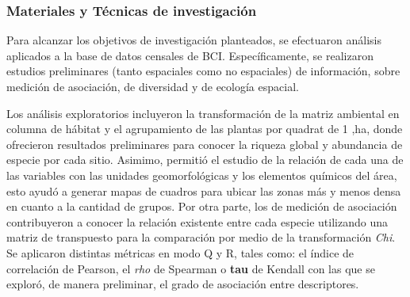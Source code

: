 \documentclass[11pt,]{article}
\begin{document}
\subsubsection{Materiales y Técnicas de
investigación}\label{materiales-y-tuxe9cnicas-de-investigaciuxf3n}

Para alcanzar los objetivos de investigación planteados, se efectuaron
análisis aplicados a la base de datos censales de BCI. Específicamente,
se realizaron estudios preliminares (tanto espaciales como no
espaciales) de información, sobre medición de asociación, de diversidad
y de ecología espacial.

Los análisis exploratorios incluyeron la transformación de la matriz
ambiental en columna de hábitat y el agrupamiento de las plantas por
quadrat de 1 ,ha, donde ofrecieron resultados preliminares para conocer
la riqueza global y abundancia de especie por cada sitio. Asimimo,
permitió el estudio de la relación de cada una de las variables con las
unidades geomorfológicas y los elementos químicos del área, esto ayudó a
generar mapas de cuadros para ubicar las zonas más y menos densa en
cuanto a la cantidad de grupos. Por otra parte, los de medición de
asociación contribuyeron a conocer la relación existente entre cada
especie utilizando una matriz de transpuesto para la comparación por
medio de la transformación \emph{Chi}. Se aplicaron distintas métricas
en modo Q y R, tales como: el índice de correlación de Pearson, el
\emph{rho} de Spearman o \textbf{tau} de Kendall con las que se exploró,
de manera preliminar, el grado de asociación entre descriptores.
\end{document}
